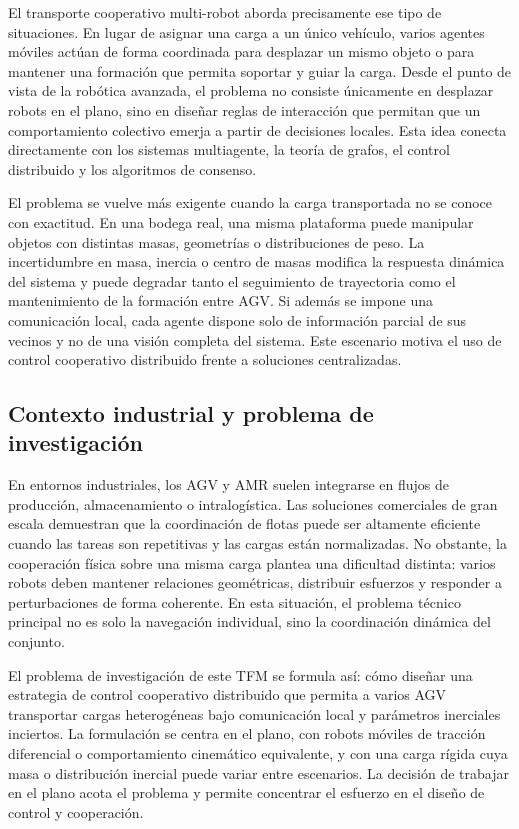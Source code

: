 \documentclass[12pt,a4paper]{article}
\begin{document}
El transporte cooperativo multi-robot aborda precisamente ese tipo de situaciones. En lugar de asignar una carga a un único vehículo, varios agentes móviles actúan de forma coordinada para desplazar un mismo objeto o para mantener una formación que permita soportar y guiar la carga. Desde el punto de vista de la robótica avanzada, el problema no consiste únicamente en desplazar robots en el plano, sino en diseñar reglas de interacción que permitan que un comportamiento colectivo emerja a partir de decisiones locales. Esta idea conecta directamente con los sistemas multiagente, la teoría de grafos, el control distribuido y los algoritmos de consenso.

El problema se vuelve más exigente cuando la carga transportada no se conoce con exactitud. En una bodega real, una misma plataforma puede manipular objetos con distintas masas, geometrías o distribuciones de peso. La incertidumbre en masa, inercia o centro de masas modifica la respuesta dinámica del sistema y puede degradar tanto el seguimiento de trayectoria como el mantenimiento de la formación entre AGV. Si además se impone una comunicación local, cada agente dispone solo de información parcial de sus vecinos y no de una visión completa del sistema. Este escenario motiva el uso de control cooperativo distribuido frente a soluciones centralizadas.

\subsection{Contexto industrial y problema de investigación}

En entornos industriales, los AGV y AMR suelen integrarse en flujos de producción, almacenamiento o intralogística. Las soluciones comerciales de gran escala demuestran que la coordinación de flotas puede ser altamente eficiente cuando las tareas son repetitivas y las cargas están normalizadas. No obstante, la cooperación física sobre una misma carga plantea una dificultad distinta: varios robots deben mantener relaciones geométricas, distribuir esfuerzos y responder a perturbaciones de forma coherente. En esta situación, el problema técnico principal no es solo la navegación individual, sino la coordinación dinámica del conjunto.

El problema de investigación de este TFM se formula así: cómo diseñar una estrategia de control cooperativo distribuido que permita a varios AGV transportar cargas heterogéneas bajo comunicación local y parámetros inerciales inciertos. La formulación se centra en el plano, con robots móviles de tracción diferencial o comportamiento cinemático equivalente, y con una carga rígida cuya masa o distribución inercial puede variar entre escenarios. La decisión de trabajar en el plano acota el problema y permite concentrar el esfuerzo en el diseño de control y cooperación.
\end{document}
